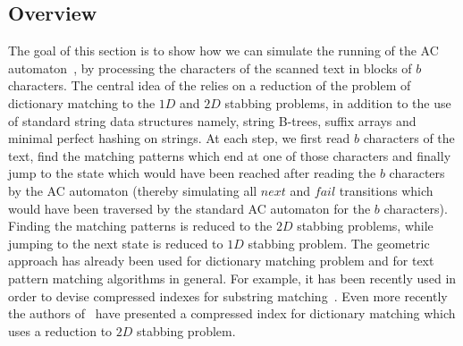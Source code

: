 \documentclass{article}
\newcommand{\?}{\mskip1.5mu}
\begin{document}
\subsection{Overview}
The goal of this section is to show how we can simulate the running of the AC automaton~\cite{AC75}, by processing the characters of the scanned text in blocks of $b$ characters. The central idea of the relies on a reduction of the problem of dictionary matching to the $1D$ and $2D$ stabbing problems, in addition to the use of standard string data structures namely, string B-trees, suffix arrays and minimal perfect hashing on strings.
At each step, we first read $b$ characters of the text, find the matching patterns which end at one of those characters and finally jump to the state which would have been reached after reading the $b$ characters by the AC automaton (thereby simulating all $next$ and $fail$ transitions which would have been traversed by the standard AC automaton for the $b$ characters). Finding the matching patterns is reduced to the $2D$ stabbing problems, while jumping to the next state is reduced to $1D$ stabbing problem. 
The geometric approach has already been used for dictionary matching problem and for text pattern matching algorithms in general. For example, it has been recently used in order to devise compressed indexes for substring matching~\cite{GV05,N04,CHSV08}. Even more recently the authors of~\cite{TWLY09} have presented a compressed index for dictionary matching which uses a reduction to $2D$ stabbing problem. 
\end{document}
